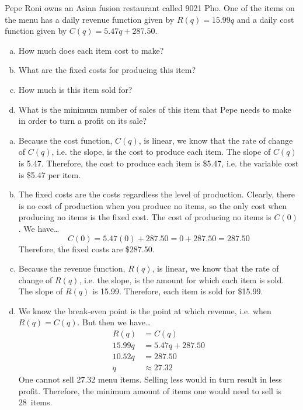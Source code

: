 \documentclass[12pt,letterpaper]{exam}
\begin{document}
\begin{questions}
\newpage
\question[10] Pepe Roni owns an Asian fusion restaurant called 9021 Pho. One of the items on the menu has a daily revenue function given by $R(q)= 15.99q$ and a daily cost function given by $C(q)= 5.47q + 287.50$. 
	\begin{enumerate}[(a)]
	\item How much does each item cost to make?
	\item What are the fixed costs for producing this item?
	\item How much is this item sold for?
	\item What is the minimum number of sales of this item that Pepe needs to make in order to turn a profit on its sale?
	\end{enumerate} \pspace

{\itshape
\sol 
\begin{enumerate}[(a)]
\item Because the cost function, $C(q)$, is linear, we know that the rate of change of $C(q)$, i.e. the slope, is the cost to produce each item. The slope of $C(q)$ is 5.47. Therefore, the cost to produce each item is \$5.47, i.e. the variable cost is \$5.47 per item. \pspace

\item The fixed costs are the costs regardless the level of production. Clearly, there is no cost of production when you produce no items, so the only cost when producing no items is the fixed cost. The cost of producing no items is $C(0)$. We have\dots
	\[
	C(0)= 5.47(0) + 287.50= 0 + 287.50= 287.50 
	\]
Therefore, the fixed costs are \$287.50. \pspace

\item Because the revenue function, $R(q)$, is linear, we know that the rate of change of $R(q)$, i.e. the slope, is the amount for which each item is sold. The slope of $R(q)$ is 15.99. Therefore, each item is sold for \$15.99. \pspace

\item We know the break-even point is the point at which revenue, i.e. when $R(q)= C(q)$. But then we have\dots
	\[
	\begin{aligned}
	R(q)&= C(q) \\[0.3cm]
	15.99q&= 5.47q + 287.50 \\[0.3cm]
	10.52q&= 287.50 \\[0.3cm]
	q&\approx 27.32
	\end{aligned}
	\]
One cannot sell 27.32 menu items. Selling less would in turn result in less profit. Therefore, the minimum amount of items one would need to sell is 28~items. 
\end{enumerate}
}




\end{questions}
\end{document}
